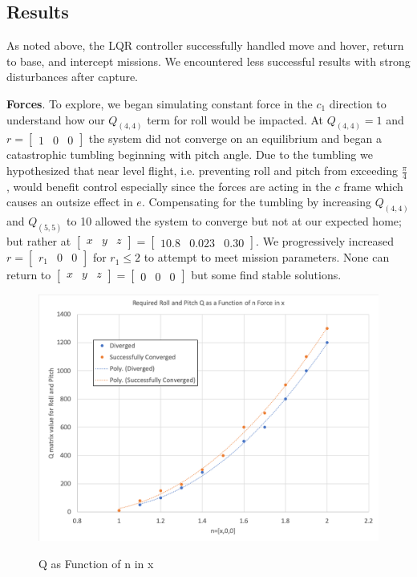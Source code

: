\documentclass{article}
\begin{document}
\begin{multicols}{2}
\section*{Results}
As noted above, the LQR controller successfully handled move and hover, return to base, and intercept missions.  We encountered less successful results with strong disturbances after capture.

\textbf{Forces}.  To explore, we began simulating constant force in the $c_1$ direction to understand how our $Q_{(4,4)}$ term for roll would be impacted.  At $Q_{(4,4)}=1$ and $r=\begin{bmatrix}1 & 0 & 0\end{bmatrix}$ the system did not converge on an equilibrium and began a catastrophic tumbling beginning with pitch angle. Due to the tumbling we hypothesized that near level flight, i.e. preventing roll and pitch from exceeding $\frac{\pi}{4}$, would benefit control especially since the forces are acting in the $c$ frame which causes an outsize effect in $e$.  Compensating for the tumbling by increasing $Q_{(4,4)}$ and $Q_{(5,5)}$ to 10 allowed the system to converge but not at our expected home; but rather at $\begin{bmatrix}x & y & z\end{bmatrix}=\begin{bmatrix}10.8 & 0.023 & 0.30\end{bmatrix}$.  We progressively increased $r=\begin{bmatrix}r_1 & 0 & 0\end{bmatrix}$ for $r_1\leq2$ to attempt to meet mission parameters.  None can return to  $\begin{bmatrix}x & y & z\end{bmatrix}=\begin{bmatrix}0 & 0 & 0\end{bmatrix}$ but some find stable solutions.  

\begin{figure}[H]
\centering
    \includegraphics[width = 1\columnwidth]{images/RollPitch.png}
     \label{fig:horizon}
     \caption{Q as Function of n in x}
\end{figure}


\end{multicols}
\end{document}
